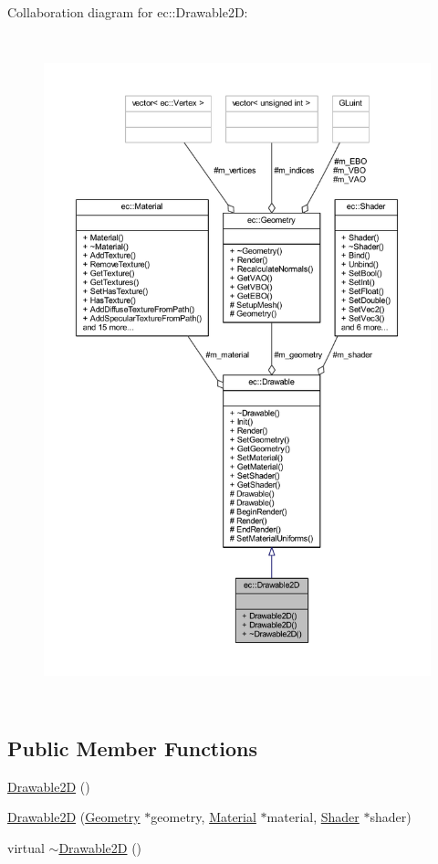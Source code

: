 Collaboration diagram for ec\+:\+:Drawable2D\+:
\nopagebreak
\begin{figure}[H]
\begin{center}
\leavevmode
\includegraphics[height=550pt]{classec_1_1_drawable2_d__coll__graph}
\end{center}
\end{figure}
\subsection*{Public Member Functions}
\begin{DoxyCompactItemize}
\item 
\mbox{\hyperlink{classec_1_1_drawable2_d_aa101d038e1ec6b969d37e39c7db804ae}{Drawable2D}} ()
\item 
\mbox{\hyperlink{classec_1_1_drawable2_d_a421840d2cde9fb991f9eef22eb77cc8e}{Drawable2D}} (\mbox{\hyperlink{classec_1_1_geometry}{Geometry}} $\ast$geometry, \mbox{\hyperlink{classec_1_1_material}{Material}} $\ast$material, \mbox{\hyperlink{classec_1_1_shader}{Shader}} $\ast$shader)
\item 
virtual \mbox{\hyperlink{classec_1_1_drawable2_d_a8a356c3fbf30122654e0c6f161dc8268}{$\sim$\+Drawable2D}} ()
\end{DoxyCompactItemize}
